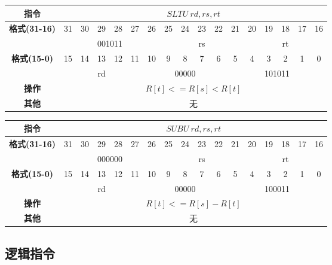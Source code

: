 \documentclass[11pt,utf8]{article}
\begin{document}
\begin{center}
\begin{tabular}{|c|c|c|c|c|c|c|c|c|c|c|c|c|c|c|c|c|}
\hline
\textbf{指令} & \multicolumn{16}{c|}{$SLTU~rd, rs, rt$} \\
\hline
\multirow{2}{*}{\textbf{格式(31-16)}} & 31 & 30 & 29 & 28 & 27 & 26 & 25 & 24 & 23 & 22 & 21 & 20 & 19 & 18 & 17 & 16 \\ 
\cline{2-17}
& \multicolumn{6}{c|}{001011} & \multicolumn{5}{c|}{rs} & \multicolumn{5}{c|}{rt}\\
\hline
\multirow{2}{*}{\textbf{格式(15-0)}} & 15 & 14 & 13 & 12 & 11 & 10 & 9 & 8 & 7 & 6 & 5 & 4 & 3 & 2 & 1 & 0 \\
\cline{2-17}
& \multicolumn{5}{c|}{rd} & \multicolumn{5}{c|}{00000} & \multicolumn{6}{c|}{101011}\\
\hline
\textbf{操作} & \multicolumn{16}{c|}{$R[t]<=R[s] < R[t]$} \\
\hline
\textbf{其他} & \multicolumn{16}{c|}{无} \\
\hline
\end{tabular}
\end{center}

\begin{center}
\begin{tabular}{|c|c|c|c|c|c|c|c|c|c|c|c|c|c|c|c|c|}
\hline
\textbf{指令} & \multicolumn{16}{c|}{$SUBU~rd, rs, rt$} \\
\hline
\multirow{2}{*}{\textbf{格式(31-16)}} & 31 & 30 & 29 & 28 & 27 & 26 & 25 & 24 & 23 & 22 & 21 & 20 & 19 & 18 & 17 & 16 \\ 
\cline{2-17}
& \multicolumn{6}{c|}{000000} & \multicolumn{5}{c|}{rs} & \multicolumn{5}{c|}{rt}\\
\hline
\multirow{2}{*}{\textbf{格式(15-0)}} & 15 & 14 & 13 & 12 & 11 & 10 & 9 & 8 & 7 & 6 & 5 & 4 & 3 & 2 & 1 & 0 \\
\cline{2-17}
& \multicolumn{5}{c|}{rd} & \multicolumn{5}{c|}{00000} & \multicolumn{6}{c|}{100011}\\
\hline
\textbf{操作} & \multicolumn{16}{c|}{$R[t]<=R[s] - R[t]$} \\
\hline
\textbf{其他} & \multicolumn{16}{c|}{无} \\
\hline
\end{tabular}
\end{center}

\subsection{逻辑指令}
\end{document}
